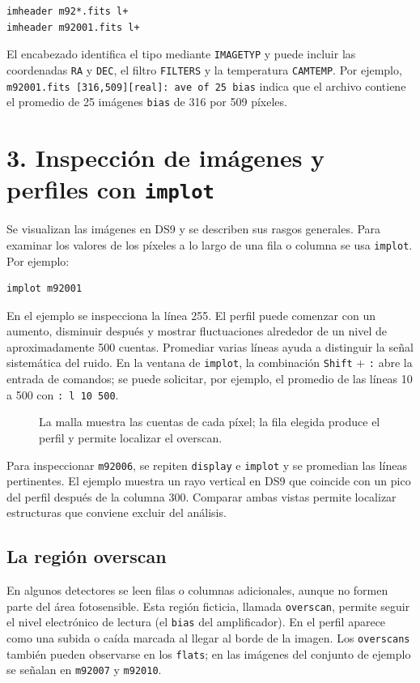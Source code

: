 \documentclass[11pt,twocolumn]{article}
\newcommand{\widefigure}[2]{\begin{figure}[!t]\centering\caption{#2}\end{figure}}
\begin{document}
\begin{verbatim}
imheader m92*.fits l+
imheader m92001.fits l+
\end{verbatim}

{\raggedright
El encabezado identifica el tipo mediante \texttt{IMAGETYP} y puede incluir las coordenadas \texttt{RA} y \texttt{DEC}, el filtro \texttt{FILTERS} y la temperatura \texttt{CAMTEMP}. Por ejemplo, \texttt{m92001.fits [316,509][real]: ave of 25 bias} indica que el archivo contiene el promedio de 25 imágenes \texttt{bias} de 316 por 509 píxeles.
\par}

\section*{3. Inspección de imágenes y perfiles con \texttt{implot}}

Se visualizan las imágenes en DS9 y se describen sus rasgos generales. Para
examinar los valores de los píxeles a lo largo de una fila o columna se usa
\texttt{implot}. Por ejemplo:

\begin{verbatim}
implot m92001
\end{verbatim}

En el ejemplo se inspecciona la línea 255. El perfil puede comenzar con un
aumento, disminuir después y mostrar fluctuaciones alrededor de un nivel de
aproximadamente 500 cuentas. Promediar varias líneas ayuda a distinguir la
señal sistemática del ruido. En la ventana de \texttt{implot}, la combinación
\texttt{Shift} + \texttt{:} abre la entrada de comandos; se puede solicitar,
por ejemplo, el promedio de las líneas 10 a 500 con \texttt{: l 10 500}.

\widefigure{figuras/perfil_implot.tex}{La malla muestra las cuentas de cada píxel; la fila elegida produce el perfil y permite localizar el overscan.}

Para inspeccionar \texttt{m92006}, se repiten \texttt{display} e \texttt{implot} y se promedian las líneas pertinentes. El ejemplo muestra un rayo vertical en DS9 que coincide con un pico del perfil después de la columna 300. Comparar ambas vistas permite localizar estructuras que conviene excluir del análisis.

\subsection*{La región overscan}
En algunos detectores se leen filas o columnas adicionales, aunque no formen
parte del área fotosensible. Esta región ficticia, llamada \texttt{overscan},
permite seguir el nivel electrónico de lectura (el \texttt{bias} del
amplificador). En el perfil aparece como una subida o caída marcada al llegar
al borde de la imagen. Los \texttt{overscans} también pueden observarse en los
\texttt{flats}; en las imágenes del conjunto de ejemplo se señalan en
\texttt{m92007} y \texttt{m92010}.
\end{document}

